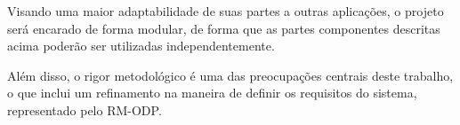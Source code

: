 	Visando uma maior adaptabilidade de suas partes a outras aplicações, o projeto será encarado de forma modular, de forma que as partes componentes descritas acima poderão ser utilizadas independentemente.\par
	
	 Além disso, o rigor metodológico é uma das preocupações centrais deste trabalho, o que inclui um refinamento na maneira de definir os requisitos do sistema, representado pelo RM-ODP.
	